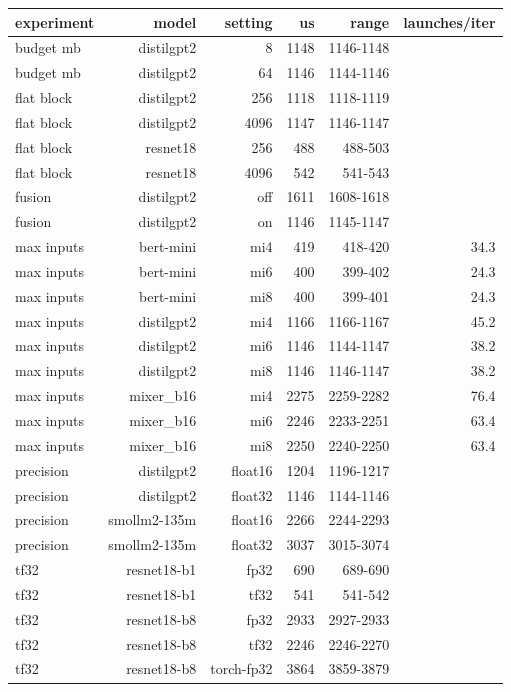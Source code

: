 \begin{tabular}{lrrrrr}
\toprule
experiment & model & setting & us & range & launches/iter \\
\midrule
budget mb & distilgpt2 & 8 & 1148 & 1146-1148 &  \\
budget mb & distilgpt2 & 64 & 1146 & 1144-1146 &  \\
flat block & distilgpt2 & 256 & 1118 & 1118-1119 &  \\
flat block & distilgpt2 & 4096 & 1147 & 1146-1147 &  \\
flat block & resnet18 & 256 & 488 & 488-503 &  \\
flat block & resnet18 & 4096 & 542 & 541-543 &  \\
fusion & distilgpt2 & off & 1611 & 1608-1618 &  \\
fusion & distilgpt2 & on & 1146 & 1145-1147 &  \\
max inputs & bert-mini & mi4 & 419 & 418-420 & 34.3 \\
max inputs & bert-mini & mi6 & 400 & 399-402 & 24.3 \\
max inputs & bert-mini & mi8 & 400 & 399-401 & 24.3 \\
max inputs & distilgpt2 & mi4 & 1166 & 1166-1167 & 45.2 \\
max inputs & distilgpt2 & mi6 & 1146 & 1144-1147 & 38.2 \\
max inputs & distilgpt2 & mi8 & 1146 & 1146-1147 & 38.2 \\
max inputs & mixer\_b16 & mi4 & 2275 & 2259-2282 & 76.4 \\
max inputs & mixer\_b16 & mi6 & 2246 & 2233-2251 & 63.4 \\
max inputs & mixer\_b16 & mi8 & 2250 & 2240-2250 & 63.4 \\
precision & distilgpt2 & float16 & 1204 & 1196-1217 &  \\
precision & distilgpt2 & float32 & 1146 & 1144-1146 &  \\
precision & smollm2-135m & float16 & 2266 & 2244-2293 &  \\
precision & smollm2-135m & float32 & 3037 & 3015-3074 &  \\
tf32 & resnet18-b1 & fp32 & 690 & 689-690 &  \\
tf32 & resnet18-b1 & tf32 & 541 & 541-542 &  \\
tf32 & resnet18-b8 & fp32 & 2933 & 2927-2933 &  \\
tf32 & resnet18-b8 & tf32 & 2246 & 2246-2270 &  \\
tf32 & resnet18-b8 & torch-fp32 & 3864 & 3859-3879 &  \\
\bottomrule
\end{tabular}
